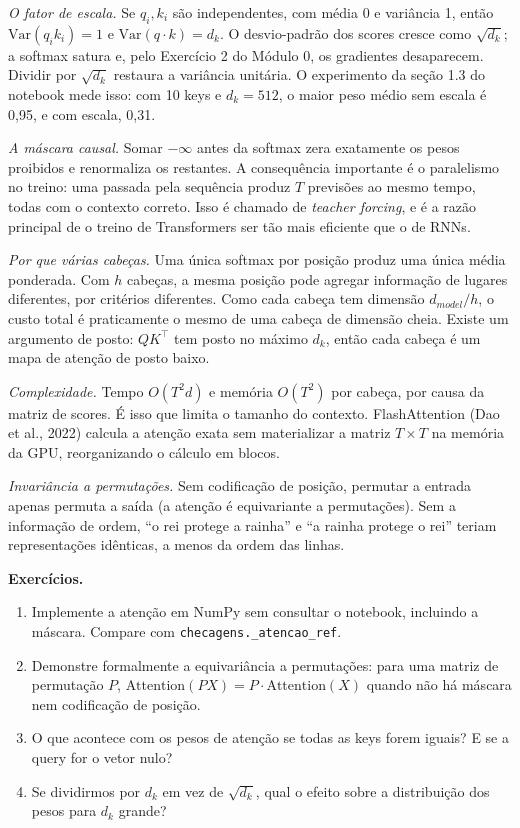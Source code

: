 \documentclass[
  11pt,
]{article}
\providecommand{\tightlist}{%
  \setlength{\itemsep}{0pt}\setlength{\parskip}{0pt}}
\begin{document}
\emph{O fator de escala.} Se \(q_i, k_i\) são independentes, com média 0
e variância 1, então \(\text{Var}(q_i k_i) = 1\) e
\(\text{Var}(q \cdot k) = d_k\). O desvio-padrão dos scores cresce como
\(\sqrt{d_k}\); a softmax satura e, pelo Exercício 2 do Módulo 0, os
gradientes desaparecem. Dividir por \(\sqrt{d_k}\) restaura a variância
unitária. O experimento da seção 1.3 do notebook mede isso: com 10 keys
e \(d_k = 512\), o maior peso médio sem escala é 0,95, e com escala,
0,31.

\emph{A máscara causal.} Somar \(-\infty\) antes da softmax zera
exatamente os pesos proibidos e renormaliza os restantes. A consequência
importante é o paralelismo no treino: uma passada pela sequência produz
\(T\) previsões ao mesmo tempo, todas com o contexto correto. Isso é
chamado de \emph{teacher forcing}, e é a razão principal de o treino de
Transformers ser tão mais eficiente que o de RNNs.

\emph{Por que várias cabeças.} Uma única softmax por posição produz uma
única média ponderada. Com \(h\) cabeças, a mesma posição pode agregar
informação de lugares diferentes, por critérios diferentes. Como cada
cabeça tem dimensão \(d_{model}/h\), o custo total é praticamente o
mesmo de uma cabeça de dimensão cheia. Existe um argumento de posto:
\(QK^\top\) tem posto no máximo \(d_k\), então cada cabeça é um mapa de
atenção de posto baixo.

\emph{Complexidade.} Tempo \(O(T^2 d)\) e memória \(O(T^2)\) por cabeça,
por causa da matriz de scores. É isso que limita o tamanho do contexto.
FlashAttention (Dao et al., 2022) calcula a atenção exata sem
materializar a matriz \(T \times T\) na memória da GPU, reorganizando o
cálculo em blocos.

\emph{Invariância a permutações.} Sem codificação de posição, permutar a
entrada apenas permuta a saída (a atenção é equivariante a permutações).
Sem a informação de ordem, ``o rei protege a rainha'' e ``a rainha
protege o rei'' teriam representações idênticas, a menos da ordem das
linhas.

\textbf{Exercícios.}

\begin{enumerate}
\def\labelenumi{\arabic{enumi}.}
\tightlist
\item
  Implemente a atenção em NumPy sem consultar o notebook, incluindo a
  máscara. Compare com \texttt{checagens.\_atencao\_ref}.
\item
  Demonstre formalmente a equivariância a permutações: para uma matriz
  de permutação \(P\),
  \(\text{Attention}(PX) = P \cdot \text{Attention}(X)\) quando não há
  máscara nem codificação de posição.
\item
  O que acontece com os pesos de atenção se todas as keys forem iguais?
  E se a query for o vetor nulo?
\item
  Se dividirmos por \(d_k\) em vez de \(\sqrt{d_k}\), qual o efeito
  sobre a distribuição dos pesos para \(d_k\) grande?
\end{enumerate}
\end{document}
